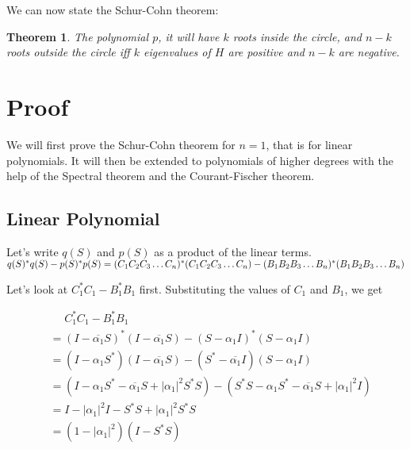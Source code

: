 \documentclass[twofold]{article}
\newcommand*\conj[1]{\overline{#1}}
\newcommand*\adj[1]{#1^*}
\newcommand*\abs[1]{\left \vert #1 \right\vert}
\theoremstyle{plain}
\newtheorem*{theorem}{Theorem}
\theoremstyle{definition}
\begin{document}
We can now state the Schur-Cohn theorem:

\begin{theorem}The polynomial \(p\), it will have \(k\) roots inside the circle, and \(n-k\) roots outside the circle iff \(k\) eigenvalues of \(H\) are positive and \(n-k\) are negative. \end{theorem}

\section{Proof}

We will first prove the Schur-Cohn theorem for \(n =1\), that is for linear polynomials. It will then be extended to polynomials of higher degrees with the help of the Spectral theorem and the Courant-Fischer theorem. 


\subsection{Linear Polynomial}


Let's write \(q(S)\) and \(p(S)\) as a product of the linear terms. \(\adj{q(S)} q(S) - \adj{p(S)} p(S) \\= \adj{(C_1C_2C_3 \ldots C_n)}(C_1C_2C_3\ldots C_n) - \adj{(B_1B_2B_3\ldots B_n)} (B_1B_2B_3\ldots B_n)\)

Let's look at \(\adj{C_1} C_1 - \adj{B_1} B_1\) first. Substituting the values of \(C_1\) and \(B_1\), we get 

\begin{equation*}
\begin{split}
& \phantom{=}    \adj{C_1}C_1 - \adj{B_1} B_1 \\
 & = \adj{(I - \conj{\alpha_1}S)} (I - \conj{\alpha_1}S) - \adj{(S - \alpha_1 I)} (S - \alpha_1 I) \\
& = (I - \alpha_1\adj{S}) (I - \conj{\alpha_1}S) - (\adj{S} - \conj{\alpha_1} I) (S - \alpha_1 I) \\
 & = (I - \alpha_1\adj{S} - \conj{\alpha_1}S + \abs{\alpha_1}^2 \adj{S} S) - (\adj{S} S - \alpha_1 \adj{S} - \conj{\alpha_1} S + \abs{\alpha_1}^2I)\\
& = I - \abs{\alpha_1}^2 I - \adj{S} S + \abs{\alpha_1}^2 \adj{S} S \\
& = (1 - \abs{\alpha_1}^2) (I - \adj{S} S)
\end{split}
\end{equation*}
\end{document}
